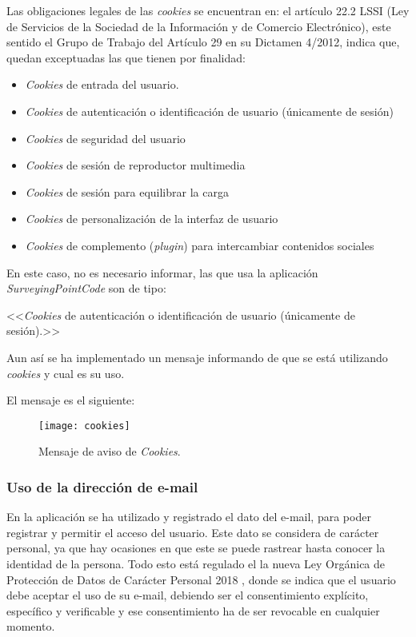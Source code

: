 Las obligaciones legales de las \emph{cookies} se encuentran en: el artículo 22.2 LSSI (Ley de Servicios de la Sociedad de la Información y de Comercio Electrónico), este sentido el Grupo de Trabajo del Artículo 29 en su Dictamen 4/2012, indica que, quedan exceptuadas las que tienen por finalidad:

\begin{itemize}

\item\emph{Cookies} de entrada del usuario.
\item\emph{Cookies} de autenticación o identificación de usuario (únicamente de sesión)
\item\emph{Cookies} de seguridad del usuario
\item\emph{Cookies} de sesión de reproductor multimedia
\item\emph{Cookies} de sesión para equilibrar la carga
\item\emph{Cookies} de personalización de la interfaz de usuario
\item\emph{Cookies} de complemento (\emph{plugin}) para intercambiar contenidos sociales

\end{itemize}

En este caso, no es necesario informar, las que usa la aplicación \emph{SurveyingPointCode} son de tipo:

<<\emph{Cookies} de autenticación o identificación de usuario (únicamente de sesión).>>

Aun así se ha implementado un mensaje informando de que se está utilizando \emph{cookies} y cual es su uso.

El mensaje es el siguiente:
 
\begin{figure}[H]
	\centering
	\texttt{[image: cookies]}
	\caption{Mensaje de aviso de \emph{Cookies}.}
	\label{fig:Scrum}
\end{figure}

\subsubsection{Uso de la dirección de e-mail}

En la aplicación se ha utilizado y registrado el dato del e-mail, para poder registrar y permitir el acceso del usuario. Este dato se considera de carácter personal, ya que hay ocasiones en que este se puede rastrear hasta conocer la identidad de la persona. Todo esto está regulado el la nueva Ley Orgánica de Protección de Datos de Carácter Personal 2018 \cite{LOPD}, donde se indica que el usuario debe aceptar el uso de su e-mail, debiendo ser el consentimiento explícito, específico y verificable y ese consentimiento ha de ser revocable en cualquier momento.

